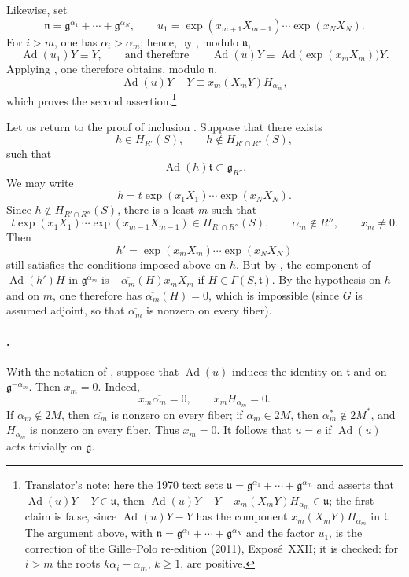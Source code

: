 Likewise, set
\[
  \mathfrak n
  =
  \mathfrak g^{\alpha_1}+\cdots+\mathfrak g^{\alpha_N},
  \qquad
  u_1
  =
  \exp(x_{m+1}X_{m+1})\cdots\exp(x_NX_N).
\]
For \(i>m\), one has \(\alpha_i>\alpha_m\); hence, by , modulo
\(\mathfrak n\),
\[
  \operatorname{Ad}(u_1)Y\equiv Y,
  \qquad\text{and therefore}\qquad
  \operatorname{Ad}(u)Y
  \equiv
  \operatorname{Ad}\bigl(\exp(x_mX_m)\bigr)Y.
\]
Applying , one therefore obtains, modulo
\(\mathfrak n\),
\[
  \operatorname{Ad}(u)Y-Y
  \equiv
  x_m(X_mY)H_{\alpha_m},
\]
which proves the second assertion.\footnote{Translator's note: here the
1970 text sets \(\mathfrak u=\mathfrak g^{\alpha_1}+\cdots+\mathfrak g^{\alpha_m}\)
and asserts that \(\operatorname{Ad}(u)Y-Y\in\mathfrak u\), then
\(\operatorname{Ad}(u)Y-Y-x_m(X_mY)H_{\alpha_m}\in\mathfrak u\); the first
claim is false, since \(\operatorname{Ad}(u)Y-Y\) has the component
\(x_m(X_mY)H_{\alpha_m}\) in \(\mathfrak t\). The argument above, with
\(\mathfrak n=\mathfrak g^{\alpha_1}+\cdots+\mathfrak g^{\alpha_N}\) and the
factor \(u_1\), is the correction of the Gille--Polo re-edition (2011),
Exposé~XXII; it is checked: for \(i>m\) the roots \(k\alpha_i-\alpha_m\),
\(k\geq1\), are positive.}

Let us return to the proof of inclusion \textup{}. Suppose that
there exists
\[
  h\in H_{R'}(S),
  \qquad
  h\notin H_{R'\cap R''}(S),
\]
such that
\[
  \operatorname{Ad}(h)\mathfrak t\subset\mathfrak g_{R''}.
\]
We may write
\[
  h=t\exp(x_1X_1)\cdots\exp(x_NX_N).
\]
Since \(h\notin H_{R'\cap R''}(S)\), there is a least \(m\) such
that
\[
  t\exp(x_1X_1)\cdots\exp(x_{m-1}X_{m-1})
  \in H_{R'\cap R''}(S),
  \qquad
  \alpha_m\notin R'',
  \qquad
  x_m\neq0.
\]
Then
\[
  h'=\exp(x_mX_m)\cdots\exp(x_NX_N)
\]
still satisfies the conditions imposed above on \(h\). But by ,
the component of \(\operatorname{Ad}(h')H\) in \(\mathfrak g^{\alpha_m}\) is
\(-\overline{\alpha_m}(H)x_mX_m\) if \(H\in\Gamma(S,\mathfrak t)\). By
the hypothesis on \(h\) and on \(m\), one therefore has
\(\overline{\alpha_m}(H)=0\), which is impossible \textup{(since \(G\) is
assumed adjoint, so that \(\overline{\alpha_m}\) is nonzero on every
fiber)}.

\paragraph{.}
With the notation of , suppose that
\(\operatorname{Ad}(u)\) induces the identity on \(\mathfrak t\) and
on \(\mathfrak g^{-\alpha_m}\). Then \(x_m=0\). Indeed,
\[
  x_m\overline{\alpha_m}=0,
  \qquad
  x_mH_{\alpha_m}=0.
\]
If \(\alpha_m\notin2M\), then \(\overline{\alpha_m}\) is nonzero on
every fiber; if \(\alpha_m\in2M\), then
\(\alpha_m^\ast\notin2M^\ast\), and \(H_{\alpha_m}\) is nonzero on
every fiber. Thus \(x_m=0\). It follows that \(u=e\) if
\(\operatorname{Ad}(u)\) acts trivially on \(\mathfrak g\).

